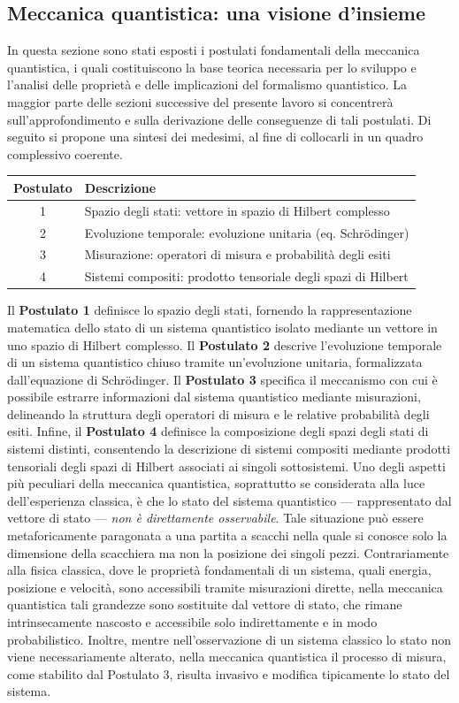 \documentclass[a4paper,12pt]{report}
\theoremstyle{plain}
\begin{document}
\subsection{Meccanica quantistica: una visione d'insieme}
In questa sezione sono stati esposti i postulati fondamentali della meccanica quantistica, i quali costituiscono la base teorica necessaria per lo sviluppo e l'analisi delle proprietà e delle implicazioni del formalismo quantistico. La maggior parte delle sezioni successive del presente lavoro si concentrerà sull’approfondimento e sulla derivazione delle conseguenze di tali postulati. Di seguito si propone una sintesi dei medesimi, al fine di collocarli in un quadro complessivo coerente.
\begin{center}
\begin{tabular}{|c|l|}
\hline
\textbf{Postulato} & \textbf{Descrizione} \\
\hline
1 & Spazio degli stati: vettore in spazio di Hilbert complesso \\
2 & Evoluzione temporale: evoluzione unitaria (eq. Schrödinger) \\
3 & Misurazione: operatori di misura e probabilità degli esiti \\
4 & Sistemi compositi: prodotto tensoriale degli spazi di Hilbert \\
\hline
\end{tabular}
\end{center}
Il \textbf{Postulato 1} definisce lo spazio degli stati, fornendo la rappresentazione matematica dello stato di un sistema quantistico isolato mediante un vettore in uno spazio di Hilbert complesso. Il \textbf{Postulato 2} descrive l'evoluzione temporale di un sistema quantistico chiuso tramite un'evoluzione unitaria, formalizzata dall'equazione di Schrödinger. Il \textbf{Postulato 3} specifica il meccanismo con cui è possibile estrarre informazioni dal sistema quantistico mediante misurazioni, delineando la struttura degli operatori di misura e le relative probabilità degli esiti. Infine, il \textbf{Postulato 4} definisce la composizione degli spazi degli stati di sistemi distinti, consentendo la descrizione di sistemi compositi mediante prodotti tensoriali degli spazi di Hilbert associati ai singoli sottosistemi.
Uno degli aspetti più peculiari della meccanica quantistica, soprattutto se considerata alla luce dell'esperienza classica, è che lo stato del sistema quantistico — rappresentato dal vettore di stato — \emph{non è direttamente osservabile}. Tale situazione può essere metaforicamente paragonata a una partita a scacchi nella quale si conosce solo la dimensione della scacchiera ma non la posizione dei singoli pezzi. Contrariamente alla fisica classica, dove le proprietà fondamentali di un sistema, quali energia, posizione e velocità, sono accessibili tramite misurazioni dirette, nella meccanica quantistica tali grandezze sono sostituite dal vettore di stato, che rimane intrinsecamente nascosto e accessibile solo indirettamente e in modo probabilistico. Inoltre, mentre nell'osservazione di un sistema classico lo stato non viene necessariamente alterato, nella meccanica quantistica il processo di misura, come stabilito dal Postulato 3, risulta invasivo e modifica tipicamente lo stato del sistema.
\end{document}
